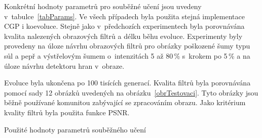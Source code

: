 Konkrétní hodnoty parametrů pro souběžné učení jsou uvedeny v~tabulce~\ref{tabParams}. Ve všech případech byla použita stejná implementace CGP i koevoluce. Stejně jako v~předchozích experimentech byla porovnávána kvalita nalezených obrazových filtrů a délku běhu evoluce. Experimenty byly provedeny na úloze návrhu obrazových filtrů pro obrázky poškozené šumy typu sůl a pepř a výstřelovým šumem o~intenzitách 5 až 80\,\% s~krokem po 5\,\% a na úloze návrhu detektoru hran v~obraze.

Evoluce byla ukončena po 100 tisících generací. Kvalita filtrů byla porovnávána pomocí sady 12 obrázků uvedených na obrázku~\ref{obrTestovaci}. Tyto obrázky jsou běžně používané komunitou zabývající se zpracováním obrazu. Jako kritérium kvality filtrů byla použita funkce PSNR.

\begin{table}[h]
    \caption{Použité hodnoty parametrů souběžného učení}
    \label{tabParams}
    \renewcommand{\arraystretch}{1.2}


\end{table}
